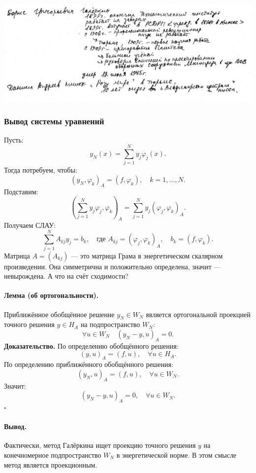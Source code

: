 \begin{center}
	\includegraphics[width=18cm]{../figures/lection_10/figure_1.png}
\end{center}

\subsubsection{Вывод системы уравнений}
Пусть:
\[
y_N(x) = \sum_{j=1}^N y_j \varphi_j(x).
\]
Тогда потребуем, чтобы:
\[
(y_N, \varphi_k)_A = (f, \varphi_k), \quad k = 1, \dots, N.
\]
Подставим:
\[
\left( \sum_{j=1}^N y_j \varphi_j, \varphi_k \right)_A = \sum_{j=1}^N y_j (\varphi_j, \varphi_k)_A.
\]
Получаем СЛАУ:
\[
\sum_{j=1}^N A_{kj} y_j = b_k, \quad \text{где } A_{kj} = (\varphi_j, \varphi_k)_A, \quad b_k = (f, \varphi_k).
\]
Матрица $A = (A_{kj})$ — это матрица Грама в энергетическом скалярном произведении. Она симметрична и положительно определена, значит — невырождена. А что на счёт сходимости?

\paragraph{Лемма (об ортогональности).}
Приближённое обобщённое решение $y_N \in W_N$ является ортогональной проекцией точного решения $y \in H_A$ на подпространство $W_N$:
\[
\forall u \in W_N \quad (y_N - y, u)_A = 0.
\]
\textbf{Доказательство.}
По определению обобщённого решения:
\[
(y, u)_A = (f, u), \quad \forall u \in H_A.
\]
По определению приближённого обобщённого решения:
\[
(y_N, u)_A = (f, u), \quad \forall u \in W_N.
\]
Значит:
\[
(y_N - y, u)_A = 0, \quad \forall u \in W_N.
\]
\hfill $\square$

\paragraph{Вывод.}
Фактически, метод Галёркина ищет проекцию точного решения $y$ на конечномерное подпространство $W_N$ в энергетической норме. В этом смысле метод является проекционным.

